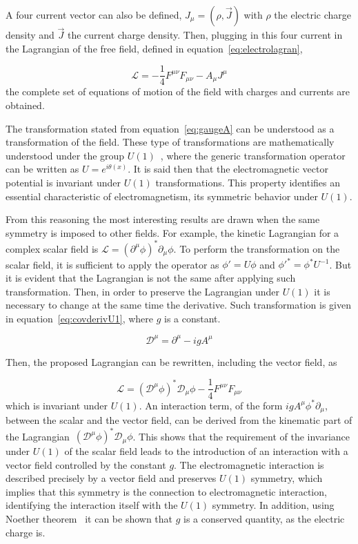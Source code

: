 A four current vector can also be defined, $J_{\mu}=\left( \rho,\vec{J} \right)$ with $\rho$ the electric charge density and $\vec{J}$ the current charge density. Then, plugging in this four current in the Lagrangian of the free field, defined in equation~\ref{eq:electrolagran}, 

\begin{equation}
  \label{eq:fulleleclagrangian}
  \mathcal{L}=-\frac{1}{4}F^{\mu\nu}F_{\mu\nu}-A_{\mu}J^{\mu}
\end{equation}the complete set of equations of motion of the field with charges and currents are obtained.

The transformation stated from equation~\ref{eq:gaugeA} can be understood as a transformation of the field. These type of transformations are mathematically understood under the group $U(1)$~\cite{Georgi:1999wka}, where the generic transformation operator can be written as $U=e^{i\theta(x)}$. It is said then that the electromagnetic vector potential is invariant under $U(1)$ transformations. This property identifies an essential characteristic of electromagnetism, its symmetric behavior under $U(1)$. 

From this reasoning the most interesting results are drawn when the same symmetry is imposed to other fields. For example, the kinetic Lagrangian for a complex scalar field is $\mathcal{L}=(\partial^{\mu}\phi)^{*}\partial_{\mu}\phi$. To perform the transformation on the scalar field, it is sufficient to apply the operator as $\phi'=U\phi$ and ${\phi'}^{*}={\phi}^{*} U^{-1}$. But it is evident that the Lagrangian is not the same after applying such transformation. Then, in order to preserve the Lagrangian under $U(1)$ it is necessary to change at the same time the derivative. Such transformation is given in equation~\ref{eq:covderivU1}, where $g$ is a constant.

\begin{equation}
  \label{eq:covderivU1}
  \mathcal{D}^{\mu}=\partial^{\mu}-igA^{\mu}
\end{equation}

Then, the proposed Lagrangian can be rewritten, including the vector field, as

\begin{equation}
  \label{eq:FullLagU1inv}
  \mathcal{L}=(\mathcal{D}^{\mu}\phi)^{*}\mathcal{D}_{\mu}\phi-\frac{1}{4}F^{\mu\nu}F_{\mu\nu}
\end{equation}which is invariant under $U(1)$. An interaction term, of the form $igA^{\mu}\phi^{*}\partial_{\mu}$, between the scalar and the vector field, can be derived from the kinematic part of the Lagrangian~$(\mathcal{D}^{\mu}\phi)^{*}\mathcal{D}_{\mu}\phi$. This shows that the requirement of the invariance under $U(1)$ of the scalar field leads to the introduction of an interaction with a vector field controlled by the constant $g$. The electromagnetic interaction is described precisely by a vector field and preserves $U(1)$ symmetry, which implies that this symmetry is the connection to electromagnetic interaction, identifying the interaction itself with the $U(1)$ symmetry. In addition, using Noether theorem~\cite{1971TTSP....1..186N} it can be shown that $g$ is a conserved quantity, as the electric charge is.

